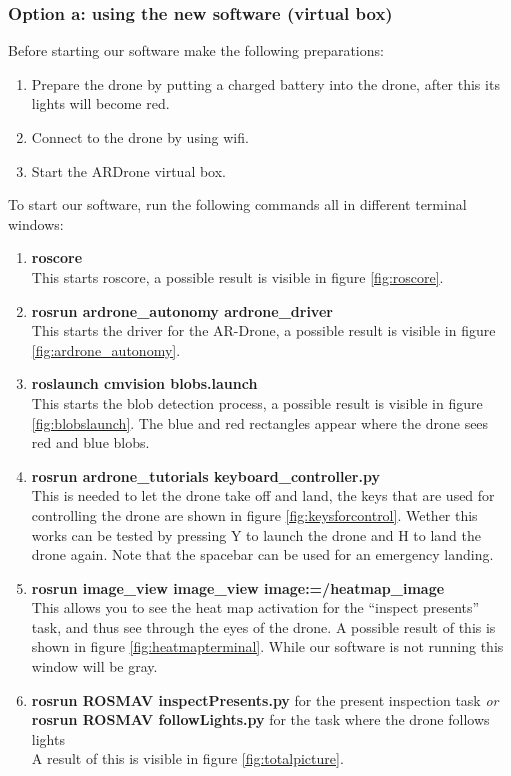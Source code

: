 \documentclass[a4paper,10pt]{article}
\begin{document}
\subsubsection{Option a: using the new software (virtual box)}
Before starting our software make the following preparations: 
\begin{enumerate}
	\item Prepare the drone by putting a charged battery into the drone, after this its lights will become red.
	\item Connect to the drone by using wifi. 
	\item Start the ARDrone virtual box.  
\end{enumerate}
To start our software, run the following commands all in different terminal windows:
\begin{enumerate}
\item \textbf{roscore} \\ This starts roscore, a possible result is visible in figure \ref{fig:roscore}.
\item \textbf{rosrun ardrone\_autonomy ardrone\_driver} \\ This starts the driver for the AR-Drone, a possible result is visible in figure \ref{fig:ardrone_autonomy}.
\item \textbf{roslaunch cmvision blobs.launch} \\ This starts the blob detection process, a possible result is visible in figure \ref{fig:blobslaunch}. The blue and red rectangles appear where the drone sees red and blue blobs. 
\item \textbf{rosrun ardrone\_tutorials keyboard\_controller.py} \\ This is needed to let the drone take off and land, the keys that are used for controlling the drone are shown in figure \ref{fig:keysforcontrol}. Wether this works can be tested by pressing Y to launch the drone and H to land the drone again. Note that the spacebar can be used for an emergency landing.
\item \textbf{rosrun image\_view image\_view image:=/heatmap\_image} \\ This
      allows you to see the heat map activation for the ``inspect presents''
      task, and thus see through the eyes of the drone. A possible result of this is shown in figure \ref{fig:heatmapterminal}. While our software is not running this window will be gray. 
\item \textbf{rosrun ROSMAV inspectPresents.py} for the present inspection task \textit{or} \\
      \textbf{rosrun ROSMAV followLights.py} for the task where the drone follows lights\\
      A result of this is visible in figure \ref{fig:totalpicture}.
\end{enumerate}
\end{document}
